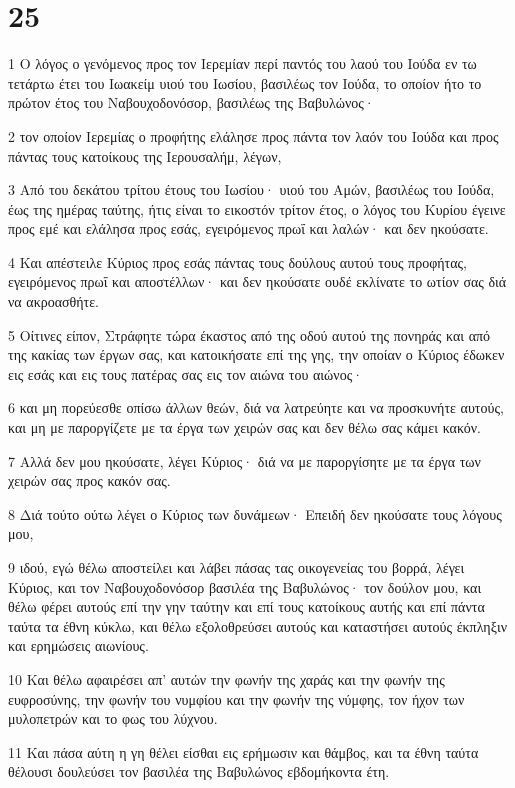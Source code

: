 \chapter{25}

\par 1 Ο λόγος ο γενόμενος προς τον Ιερεμίαν περί παντός του λαού του Ιούδα εν τω τετάρτω έτει του Ιωακείμ υιού του Ιωσίου, βασιλέως τον Ιούδα, το οποίον ήτο το πρώτον έτος του Ναβουχοδονόσορ, βασιλέως της Βαβυλώνος·
\par 2 τον οποίον Ιερεμίας ο προφήτης ελάλησε προς πάντα τον λαόν του Ιούδα και προς πάντας τους κατοίκους της Ιερουσαλήμ, λέγων,
\par 3 Από του δεκάτου τρίτου έτους του Ιωσίου· υιού του Αμών, βασιλέως του Ιούδα, έως της ημέρας ταύτης, ήτις είναι το εικοστόν τρίτον έτος, ο λόγος του Κυρίου έγεινε προς εμέ και ελάλησα προς εσάς, εγειρόμενος πρωΐ και λαλών· και δεν ηκούσατε.
\par 4 Και απέστειλε Κύριος προς εσάς πάντας τους δούλους αυτού τους προφήτας, εγειρόμενος πρωΐ και αποστέλλων· και δεν ηκούσατε ουδέ εκλίνατε το ωτίον σας διά να ακροασθήτε.
\par 5 Οίτινες είπον, Στράφητε τώρα έκαστος από της οδού αυτού της πονηράς και από της κακίας των έργων σας, και κατοικήσατε επί της γης, την οποίαν ο Κύριος έδωκεν εις εσάς και εις τους πατέρας σας εις τον αιώνα του αιώνος·
\par 6 και μη πορεύεσθε οπίσω άλλων θεών, διά να λατρεύητε και να προσκυνήτε αυτούς, και μη με παροργίζετε με τα έργα των χειρών σας και δεν θέλω σας κάμει κακόν.
\par 7 Αλλά δεν μου ηκούσατε, λέγει Κύριος· διά να με παροργίσητε με τα έργα των χειρών σας προς κακόν σας.
\par 8 Διά τούτο ούτω λέγει ο Κύριος των δυνάμεων· Επειδή δεν ηκούσατε τους λόγους μου,
\par 9 ιδού, εγώ θέλω αποστείλει και λάβει πάσας τας οικογενείας του βορρά, λέγει Κύριος, και τον Ναβουχοδονόσορ βασιλέα της Βαβυλώνος· τον δούλον μου, και θέλω φέρει αυτούς επί την γην ταύτην και επί τους κατοίκους αυτής και επί πάντα ταύτα τα έθνη κύκλω, και θέλω εξολοθρεύσει αυτούς και καταστήσει αυτούς έκπληξιν και ερημώσεις αιωνίους.
\par 10 Και θέλω αφαιρέσει απ' αυτών την φωνήν της χαράς και την φωνήν της ευφροσύνης, την φωνήν του νυμφίου και την φωνήν της νύμφης, τον ήχον των μυλοπετρών και το φως του λύχνου.
\par 11 Και πάσα αύτη η γη θέλει είσθαι εις ερήμωσιν και θάμβος, και τα έθνη ταύτα θέλουσι δουλεύσει τον βασιλέα της Βαβυλώνος εβδομήκοντα έτη.
